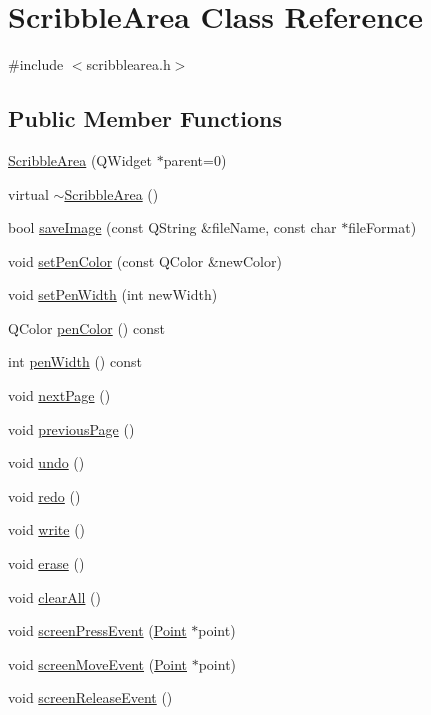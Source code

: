\hypertarget{classScribbleArea}{
\section{ScribbleArea Class Reference}
\label{classScribbleArea}
}


{\ttfamily \#include $<$scribblearea.h$>$}\subsection*{Public Member Functions}
\begin{DoxyCompactItemize}
\item 
\hyperlink{classScribbleArea_a3560f2a44b46531591a1f4b1e42ea86f}{ScribbleArea} (QWidget $\ast$parent=0)
\item 
virtual \hyperlink{classScribbleArea_a5067be9932626a2ea5d041cb0f53a070}{$\sim$ScribbleArea} ()
\item 
bool \hyperlink{classScribbleArea_a9496b9970942db6abfea836e6bf56ee4}{saveImage} (const QString \&fileName, const char $\ast$fileFormat)
\item 
void \hyperlink{classScribbleArea_a7ad908197d1fba9479da2b88d898ed42}{setPenColor} (const QColor \&newColor)
\item 
void \hyperlink{classScribbleArea_a3d9093f87987c3123744605a7a2cf15e}{setPenWidth} (int newWidth)
\item 
QColor \hyperlink{classScribbleArea_a1de2530671bd6d575a1499892e877990}{penColor} () const 
\item 
int \hyperlink{classScribbleArea_a2d1b263e57b70bf645934a1ac2f4e29f}{penWidth} () const 
\item 
void \hyperlink{classScribbleArea_a9b44c977dcec2287054f880e410980df}{nextPage} ()
\item 
void \hyperlink{classScribbleArea_a750efd0b17aaab32304ef975d2fc9948}{previousPage} ()
\item 
void \hyperlink{classScribbleArea_a6f0205b4160951f7efef3bc0741eee24}{undo} ()
\item 
void \hyperlink{classScribbleArea_a765af373a01bba4ddb8ff9cda8af7a10}{redo} ()
\item 
void \hyperlink{classScribbleArea_ad50fa04c77c2caea001b5a08799174fc}{write} ()
\item 
void \hyperlink{classScribbleArea_a33796ff14c3f79bb51e1a19e74ffc384}{erase} ()
\item 
void \hyperlink{classScribbleArea_a78dbfd362afddb2bf4e91fbc14ff8f9e}{clearAll} ()
\item 
void \hyperlink{classScribbleArea_a5c5e5eee9a891bc7b6fc107bd1d356cb}{screenPressEvent} (\hyperlink{classPoint}{Point} $\ast$point)
\item 
void \hyperlink{classScribbleArea_a457cc291cee3a2d59069bc81caf95e24}{screenMoveEvent} (\hyperlink{classPoint}{Point} $\ast$point)
\item 
void \hyperlink{classScribbleArea_a8fe830a4895773885bb2ed65dda875f5}{screenReleaseEvent} ()
\end{DoxyCompactItemize}
